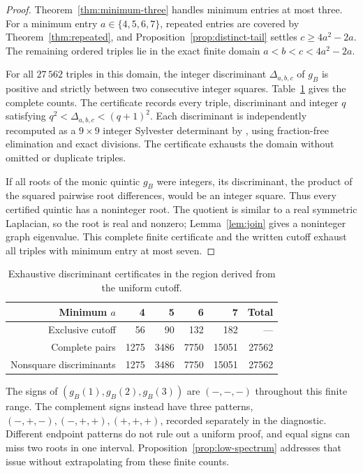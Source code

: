 \begin{proof}
Theorem~\ref{thm:minimum-three} handles minimum entries at most three.
For a minimum entry $a\in\{4,5,6,7\}$, repeated entries are covered by
Theorem~\ref{thm:repeated}, and Proposition~\ref{prop:distinct-tail}
settles $c\geq4a^2-2a$. The remaining ordered triples lie in the exact
finite domain $a<b<c<4a^2-2a$.

For all $27\,562$ triples in this domain, the integer discriminant
$\Delta_{a,b,c}$ of $g_B$ is positive and strictly between two
consecutive integer squares. Table~\ref{tab:open-region} gives the
complete counts. The certificate
 records every triple,
discriminant and integer $q$ satisfying
$q^2<\Delta_{a,b,c}<(q+1)^2$. Each discriminant is independently
recomputed as a $9\times9$ integer Sylvester determinant by
, using fraction-free
elimination and exact divisions. The certificate exhausts the domain
without omitted or duplicate triples.

If all roots of the monic quintic $g_B$ were integers, its discriminant,
the product of the squared pairwise root differences, would be an
integer square. Thus every certified quintic has a noninteger root.
The quotient is similar to a real symmetric Laplacian, so the root is
real and nonzero; Lemma~\ref{lem:join} gives a noninteger graph
eigenvalue. This complete finite certificate and the written cutoff
exhaust all triples with minimum entry at most seven.
\end{proof}

\begin{table}[ht]
\centering
\begin{tabular}{rrrrrr}
\toprule
Minimum $a$&4&5&6&7&Total\\
\midrule
Exclusive cutoff&56&90&132&182&---\\
Complete pairs&1275&3486&7750&15051&27562\\
Nonsquare discriminants&1275&3486&7750&15051&27562\\
\bottomrule
\end{tabular}
\caption{Exhaustive discriminant certificates in the region derived from
the uniform cutoff.}
\label{tab:open-region}
\end{table}

The signs of $(g_B(1),g_B(2),g_B(3))$ are $(-,-,-)$ throughout this
finite range. The complement signs instead have three patterns,
$(-,+,-),(-,+,+),(+,+,+)$, recorded separately in the diagnostic.
Different endpoint patterns do not rule out a uniform proof, and equal
signs can miss two roots in one interval. Proposition~\ref{prop:low-spectrum}
addresses that issue without extrapolating from these finite counts.
